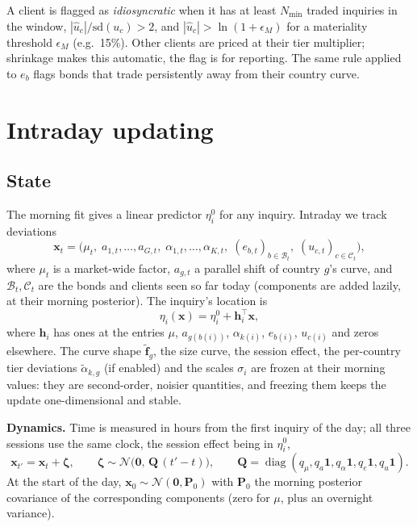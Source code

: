 \documentclass[11pt,a4paper]{article}
\theoremstyle{definition}
\theoremstyle{remark}
\newcommand{\T}{^{\top}}
\newcommand{\bx}{\bm{x}}
\newcommand{\bh}{\bm{h}}
\newcommand{\bff}{\bm{f}}
\newcommand{\Pm}{\bm{P}}
\newcommand{\Qm}{\bm{Q}}
\begin{document}
A client is flagged as \emph{idiosyncratic} when it has at least $N_{\min}$ traded inquiries in the window, $|\hat u_c|/\mathrm{sd}(u_c)>2$, and $|\hat u_c|>\ln(1+\epsilon_M)$ for a materiality threshold $\epsilon_M$ (e.g.\ 15\%). Other clients are priced at their tier multiplier; shrinkage makes this automatic, the flag is for reporting. The same rule applied to $e_b$ flags bonds that trade persistently away from their country curve.

\section{Intraday updating}\label{sec:intraday}

\subsection{State}
The morning fit gives a linear predictor $\eta^0_i$ for any inquiry. Intraday we track deviations
\[
\bx_t=\bigl(\mu_t,\;a_{1,t},\dots,a_{G,t},\;\alpha_{1,t},\dots,\alpha_{K,t},\;(e_{b,t})_{b\in\mathcal B_t},\;(u_{c,t})_{c\in\mathcal C_t}\bigr),
\]
where $\mu_t$ is a market-wide factor, $a_{g,t}$ a parallel shift of country $g$'s curve, and $\mathcal B_t,\mathcal C_t$ are the bonds and clients seen so far today (components are added lazily, at their morning posterior). The inquiry's location is
\begin{equation}\label{eq:obs}
\eta_i(\bx)=\eta^0_i+\bh_i\T\bx,
\end{equation}
where $\bh_i$ has ones at the entries $\mu$, $a_{g(b(i))}$, $\alpha_{k(i)}$, $e_{b(i)}$, $u_{c(i)}$ and zeros elsewhere. The curve shape $\tilde{\bff}_g$, the size curve, the session effect, the per-country tier deviations $\tilde\alpha_{k,g}$ (if enabled) and the scales $\sigma_i$ are frozen at their morning values: they are second-order, noisier quantities, and freezing them keeps the update one-dimensional and stable.

\textbf{Dynamics.} Time is measured in hours from the first inquiry of the day; all three sessions use the same clock, the session effect being in $\eta^0_i$,
\begin{equation}\label{eq:dyn}
\bx_{t'}=\bx_t+\bm\zeta,\qquad \bm\zeta\sim\mathcal N\bigl(\bm0,\,\Qm\,(t'-t)\bigr),\qquad \Qm=\operatorname{diag}(q_\mu,q_a\bm1,q_\alpha\bm1,q_e\bm1,q_u\bm1).
\end{equation}
At the start of the day, $\bx_0\sim\mathcal N(\bm0,\Pm_0)$ with $\Pm_0$ the morning posterior covariance of the corresponding components (zero for $\mu$, plus an overnight variance).
\end{document}
